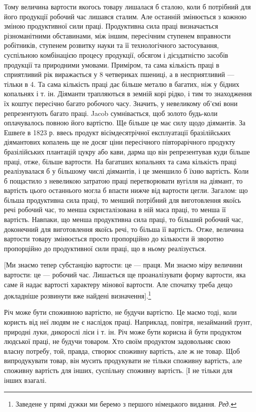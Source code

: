 Тому величина вартости якогось товару лишалася б сталою,
коли б потрібний для його продукції робочий час лишався сталим.
Але останній змінюється з кожною зміною продуктивної
сили праці. Продуктивна сила праці визначається різноманітними
обставинами, між іншим, пересічним ступенем вправности робітників,
ступенем розвитку науки та її технологічного застосування,
суспільною комбінацією процесу продукції, обсягом і дієздатністю
засобів продукції та природними умовами. Приміром, та сама
кількість праці в сприятливий рік виражається у 8 четвериках
пшениці, а в несприятливий — тільки в 4. Та сама кількість праці
дає більше металю в багатих, ніж у бідних копальнях і т. ін.
Діяманти трапляються в земній корі рідко, і тим то знаходження
їх коштує пересічно багато робочого часу. Значить, у невеликому
об’ємі вони репрезентують багато праці. Jacob сумнівається, щоб
золото будь-коли оплачувалось повною його вартістю. Ще
більше це має силу щодо діямантів. За Ешвеґе в 1823 р. ввесь
продукт вісімдесятрічної експлуатації бразілійських діямантових
копалень ще не досяг ціни пересічного півторарічного продукту
бразілійських плантацій цукру або кави, дарма що він репрезентував
куди більше праці, отже, більше вартости. На багатших
копальнях та сама кількість праці реалізувалася б у більшому
числі діямантів, і це зменшило б їхню вартість. Коли б пощастило
з невеликою затратою праці перетворювати вугілля на діямант,
то вартість цього останнього могла б впасти нижче від вартости
цегли. Загалом: що більша продуктивна сила праці, то менший
потрібний для виготовлення якоїсь речі робочий час, то менша
скристалізована в ній маса праці, то менша її вартість. Навпаки,
що менша продуктивна сила праці, то більший робочий час, доконечний
для виготовлення якоїсь речі, то більша її вартість.
Отже, величина вартости товару змінюється просто пропорційно
до кількости й зворотно пропорційно до продуктивної сили праці,
що в ньому реалізується.

[Ми знаємо тепер субстанцію вартости: це — праця. Ми знаємо
міру величини вартости: це — робочий час. Лишається ще проаналізувати
форму вартости, яка саме й надає вартості характеру
мінової вартости. Але спочатку треба дещо докладніше розвинути
вже найдені визначення].\footnote*{
Заведене у прямі дужки ми беремо з першого німецького видання. \emph{Ред.}
}

Річ може бути споживною вартістю, не будучи вартістю. Це
маємо тоді, коли користь від неї людям не є наслідок праці. Наприклад,
повітря, незайманий ґрунт, природні луки, дикорослі
ліси і т. ін. Річ може бути корисна й бути продуктом людської
праці, не будучи товаром. Хто своїм продуктом задовольняє свою
власну потребу, той, правда, створює споживну вартість, але ж
не товар. Щоб випродукувати товар, він мусить продукувати не
тільки споживну вартість, але споживну вартість для інших,
суспільну споживну вартість. [І не тільки для інших взагалі.
\parbreak{}  %
